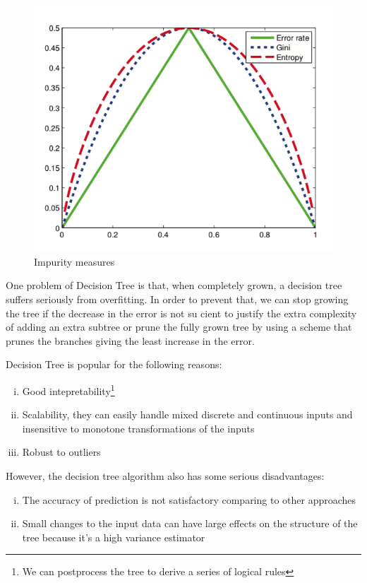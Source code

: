 \documentclass[10pt,twocolumn,letterpaper]{article}
\begin{document}
    	\begin{figure}[h]
			\begin{center}
				\includegraphics[width=0.8\linewidth]{images/impurity}
				\caption{Impurity measures\cite{murphy_2013}}
			\end{center}
		\end{figure}
		
		One problem of Decision Tree is that, when completely grown, a decision tree suffers seriously from overfitting. In order to prevent that, we can stop growing the tree if the decrease in the error is not su cient to justify the extra complexity of adding an extra subtree\cite{murphy_2013} or prune the fully grown tree by using a scheme that prunes the branches giving the least increase in the error\cite{breiman1984classification}.
		
		Decision Tree is popular for the following reasons:
		
		\begin{enumerate}[(i).]
			\item Good intepretability\footnote{We can postprocess the tree to derive a series of logical rules\cite{quinlan1990decision}}
			\item Scalability, they can easily handle mixed discrete and continuous inputs and insensitive to monotone transformations of the inputs\cite{murphy_2013}
			\item Robust to outliers\cite{murphy_2013}
		\end{enumerate} 
		
		However, the decision tree algorithm also has some serious disadvantages:
		\begin{enumerate}[(i).]
			\item The accuracy of prediction is not satisfactory comparing to other approaches
			\item Small changes to the input data can have large effects on the structure of the tree because it's a high variance estimator\cite{murphy_2013}
		\end{enumerate}
		
\end{document}
